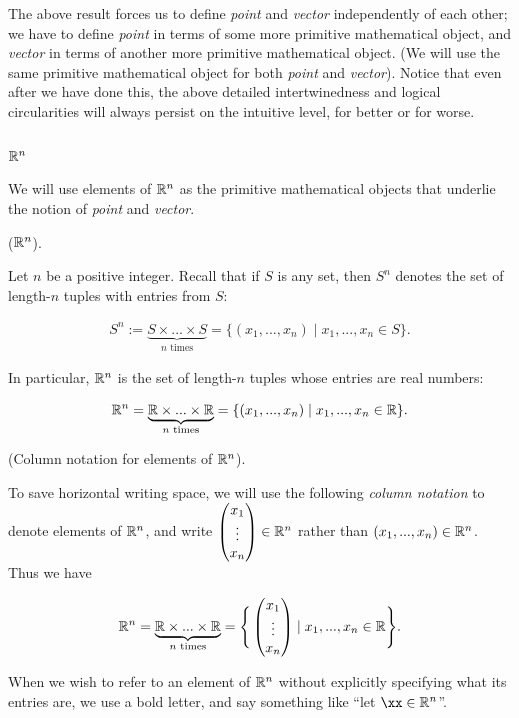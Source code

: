 The above result forces us to define \textit{point} and \textit{vector} independently of each other; we have to define \textit{point} in terms of some more primitive mathematical object, and \textit{vector} in terms of another more primitive mathematical object. (We will use the same primitive mathematical object for both \textit{point} and \textit{vector}). Notice that even after we have done this, the above detailed intertwinedness and logical circularities will always persist on the intuitive level, for better or for worse.

\newpage

\subsection*{$\mathbb{R}^n$}

We will use elements of $\mathbb{R}^n$ as the primitive mathematical objects that underlie the notion of \textit{point} and \textit{vector}.

\begin{defn}
    ($\mathbb{R}^n$).
    
    Let $n$ be a positive integer. Recall that if $S$ is any set, then $S^n$ denotes the set of length-$n$ tuples with entries from $S$:
    
    \begin{align*}
        S^n := \underbrace{S \times ... \times S}_{\text{$n$ times}} = \{(x_1, ..., x_n) \mid x_1, ..., x_n \in S\}.
    \end{align*}
    
    In particular, $\mathbb{R}^n$ is the set of length-$n$ tuples whose entries are real numbers: 
    
    \begin{align*}
        \mathbb{R}^n = \underbrace{\mathbb{R} \times ... \times \mathbb{R}}_{\text{$n$ times}} = \{(x_1, ..., x_n) \mid x_1, ..., x_n \in \mathbb{R}\}.
    \end{align*}
\end{defn}

\begin{defn}
    (Column notation for elements of $\mathbb{R}^n$).
    
    To save horizontal writing space, we will use the following \textit{column notation} to denote elements of $\mathbb{R}^n$, and write $\begin{pmatrix} x_1 \\ \vdots \\ x_n \end{pmatrix} \in \mathbb{R}^n$ rather than $(x_1, ..., x_n) \in \mathbb{R}^n$. Thus we have
    
    \begin{align*}
        \mathbb{R}^n = \underbrace{\mathbb{R} \times ... \times \mathbb{R}}_{\text{$n$ times}} = \Bigg\{ \begin{pmatrix} x_1 \\ \vdots \\ x_n \end{pmatrix} \mid x_1, ..., x_n \in \mathbb{R} \Bigg\}.
    \end{align*}
    
    When we wish to refer to an element of $\mathbb{R}^n$ without explicitly specifying what its entries are, we use a bold letter, and say something like ``let $\xx \in \R^n$''.
\end{defn}

